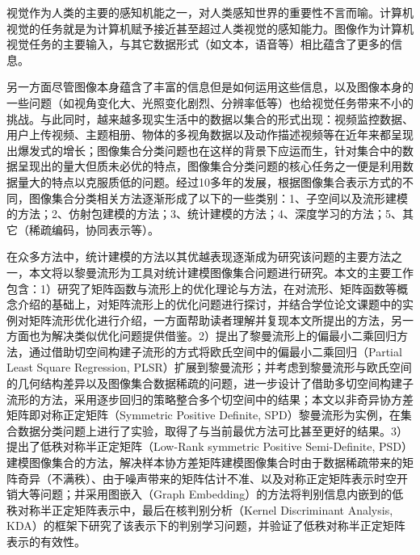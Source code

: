 \begin{cabstract}
视觉作为人类的主要的感知机能之一，对人类感知世界的重要性不言而喻。计算机视觉的任务就是为计算机赋予接近甚至超过人类视觉的感知能力。图像作为计算机视觉任务的主要输入，与其它数据形式（如文本，语音等）相比蕴含了更多的信息。

另一方面尽管图像本身蕴含了丰富的信息但是如何运用这些信息，以及图像本身的一些问题（如视角变化大、光照变化剧烈、分辨率低等）也给视觉任务带来不小的挑战。与此同时，越来越多现实生活中的数据以集合的形式出现：视频监控数据、用户上传视频、主题相册、物体的多视角数据以及动作描述视频等在近年来都呈现出爆发式的增长；图像集合分类问题也在这样的背景下应运而生，针对集合中的数据呈现出的量大但质未必优的特点，图像集合分类问题的核心任务之一便是利用数据量大的特点以克服质低的问题。经过10多年的发展，根据图像集合表示方式的不同，图像集合分类相关方法逐渐形成了以下的一些类别：1、子空间以及流形建模的方法；2、仿射包建模的方法；3、统计建模的方法；4、深度学习的方法；5、其它（稀疏编码，协同表示等）。

在众多方法中，统计建模的方法以其优越表现逐渐成为研究该问题的主要方法之一，本文将以黎曼流形为工具对统计建模图像集合问题进行研究。本文的主要工作包含：1）研究了矩阵函数与流形上的优化理论与方法，在对流形、矩阵函数等概念介绍的基础上，对矩阵流形上的优化问题进行探讨，并结合学位论文课题中的实例对矩阵流形优化进行介绍，一方面帮助读者理解并复现本文所提出的方法，另一方面也为解决类似优化问题提供借鉴。2）提出了黎曼流形上的偏最小二乘回归方法，通过借助切空间构建子流形的方式将欧氏空间中的偏最小二乘回归（Partial Least Square Regression, PLSR）扩展到黎曼流形；并考虑到黎曼流形与欧氏空间的几何结构差异以及图像集合数据稀疏的问题，进一步设计了借助多切空间构建子流形的方法，采用逐步回归的策略整合多个切空间中的结果；本文以非奇异协方差矩阵即对称正定矩阵（Symmetric Positive Definite, SPD）黎曼流形为实例，在集合数据分类问题上进行了实验，取得了与当前最优方法可比甚至更好的结果。3）提出了低秩对称半正定矩阵（Low-Rank symmetric Positive Semi-Definite, PSD）建模图像集合的方法，解决样本协方差矩阵建模图像集合时由于数据稀疏带来的矩阵奇异（不满秩）、由于噪声带来的矩阵估计不准、以及对称正定矩阵表示时空开销大等问题；并采用图嵌入（Graph Embedding）的方法将判别信息内嵌到的低秩对称半正定矩阵表示中，最后在核判别分析（Kernel Discriminant Analysis, KDA）的框架下研究了该表示下的判别学习问题，并验证了低秩对称半正定矩阵表示的有效性。


\end{cabstract}
